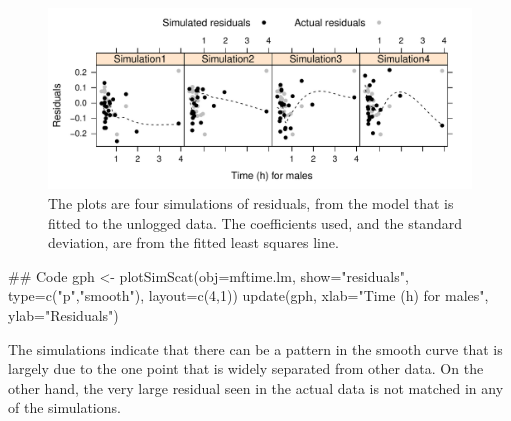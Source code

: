 \documentclass{tufte-book}\usepackage[]{graphicx}\usepackage[]{color}
\begin{document}
\begin{figure}
\vspace*{-12pt}

\begin{Schunk}


\centerline{\includegraphics[width=\textwidth]{figs/8-simscat-1} }

\end{Schunk}
\caption{The plots are four simulations of residuals, from the
  model that is fitted to the unlogged data.  The coefficients
  used, and the standard deviation, are from the fitted least squares
  line.\label{fig:4sim-mftimeres1}}
%
\end{figure}
\begin{Schunk}
\begin{Sinput}
## Code
gph <- plotSimScat(obj=mftime.lm, show="residuals",
                   type=c("p","smooth"),
                   layout=c(4,1))
update(gph, xlab="Time (h) for males",
      ylab="Residuals")
\end{Sinput}
\end{Schunk}

The simulations indicate that there can be a pattern in the smooth
curve that is largely due to the one point that is widely separated
from other data. On the other hand, the very large residual seen in
the actual data is not matched in any of the simulations.
\end{document}
